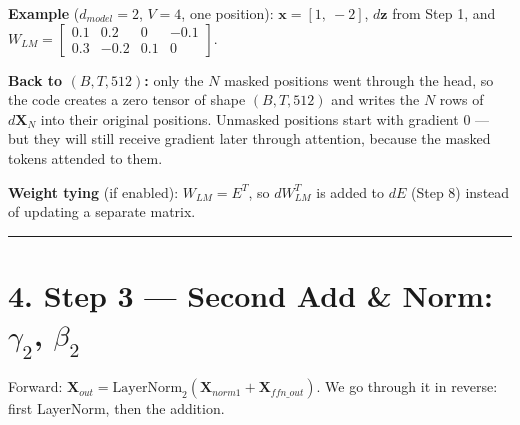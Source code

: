 \documentclass[11pt,a4paper,oneside]{report}
\begin{document}
\textbf{Example} (\(d_{model} = 2\), \(V = 4\), one position): \(\mathbf{x} = [1,\ -2]\), \(d\mathbf{z}\) from Step 1, and
\(W_{LM} = \begin{bmatrix} 0.1 & 0.2 & 0 & -0.1 \\ 0.3 & -0.2 & 0.1 & 0 \end{bmatrix}\).

\begin{center}\end{center}

\begin{center}\end{center}

\textbf{Back to \((B, T, 512)\):} only the \(N\) masked positions went through the head, so the code creates a zero tensor of shape \((B, T, 512)\) and writes the \(N\) rows of \(d\mathbf{X}_N\) into their original positions. Unmasked positions start with gradient \(0\) --- but they will still receive gradient later through attention, because the masked tokens attended to them.

\textbf{Weight tying} (if enabled): \(W_{LM} = E^T\), so \(dW_{LM}^T\) is added to \(dE\) (Step 8) instead of updating a separate matrix.

\begin{center}\rule{0.5\linewidth}{0.5pt}\end{center}

\section{\texorpdfstring{4. Step 3 --- Second Add \& Norm: \(\gamma_2\), \(\beta_2\)}{4. Step 3 --- Second Add \& Norm: \textbackslash gamma\_2, \textbackslash beta\_2}}\label{4-step-3--second-add--norm-gamma_2-beta_2}

Forward: \(\mathbf{X}_{out} = \text{LayerNorm}_2(\mathbf{X}_{norm1} + \mathbf{X}_{ffn\_out})\). We go through it in reverse: first LayerNorm, then the addition.
\end{document}
